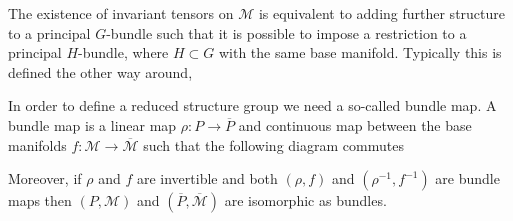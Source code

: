 The existence of invariant tensors on $\mathcal{M}$ is equivalent to adding further structure to a principal $G$-bundle such that it is possible to impose a restriction to a principal $H$-bundle, where $H\subset G$ with the same base manifold. Typically this is defined the other way around,  


In order to define a reduced structure group we need a so-called bundle map. A bundle map is a linear map $\rho: P\to \overbar{P}$ and continuous map between the base manifolds $f: \mathcal{M}\to \overbar{\mathcal{M}}$ such that the following diagram commutes
\begin{center}
\end{center}
Moreover, if $\rho$ and $f$ are invertible and both $(\rho,f)$ and $(\rho^{-1},f^{-1})$ are bundle maps then $(P,\mathcal{M})$ and $(\overbar{P},\overbar{\mathcal{M}})$ are isomorphic as bundles. 


